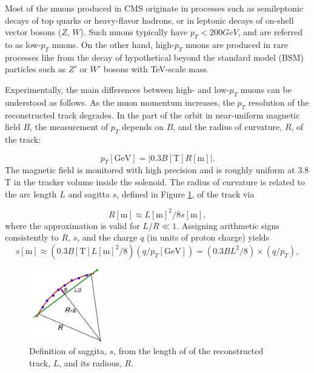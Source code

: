 Most of the muons produced in CMS originate in processes such as semileptonic decays of top quarks or heavy-flavor hadrons, or in leptonic decays of on-shell vector bosons ($Z$, $W$).
Such muons typically have $p_{T} < 200 GeV$, and are referred to as low-$p_{T}$ muons.
On the other hand, high-$p_{T}$ muons are produced in rare processes like from the decay of hypothetical beyond the standard model (BSM) particles such as $Z'$ or $W'$ bosons with TeV-scale mass.

Experimentally, the main differences between high- and low-$p_{T}$ muons can be understood as follows.
As the muon momentum increases, the $p_{T}$ resolution of the reconstructed track degrades. In the part of the orbit in near-uniform magnetic field $B$, the measurement of $p_{T}$ depends on $B$, and the radius of curvature, $R$, of the track:

\begin{equation}
  p_{T}[\text{GeV}] = \left|0.3 B[\text{T}] R[\text{m}]\right|.
\label{eq:pTvsRadius}
\end{equation}
The magnetic field is monitored with high precision and is roughly uniform at 3.8 T in the tracker volume inside the solenoid. The radius of curvature is related to the arc length $L$ and sagitta $s$, defined in Figure \ref{fig:SagittaDef},  of the track via

\begin{equation}
  R[\text{m}]\approx L[\text{m}]^{2}/8s[\text{m}],
\label{eq:RadiusvsSagitta}
\end{equation}
where the approximation is valid for $L/R \ll 1$. Assigning arithmetic signs consistently to $R$, $s$, and the charge $q$ (in units of proton charge) yields
\begin{equation}
  s[\text{m}]\approx (0.3 B [\text{T}] L[\text{m}]^{2}/8) (q/p_{T}[\text{GeV}]) =  (0.3 BL^{2}/8) \times (q/p_{T}),
\label{eq:SagittavsPt}
\end{equation}

\begin{figure}
\centering
\includegraphics[width=0.30\textwidth]{figures/curvaturesketch.png}
\caption{Definition of saggita, $s$, from the length of of the reconstructed track, $L$, and its radious, $R$.}
\label{fig:SagittaDef}
\end{figure}

